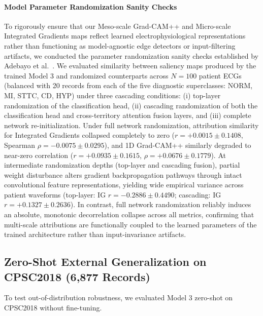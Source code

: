 \documentclass[5p,twocolumn,10pt]{elsarticle}
\begin{document}
\paragraph{Model Parameter Randomization Sanity Checks}
To rigorously ensure that our Meso-scale Grad-CAM++ and Micro-scale Integrated Gradients maps reflect learned electrophysiological representations rather than functioning as model-agnostic edge detectors or input-filtering artifacts, we conducted the parameter randomization sanity checks established by Adebayo et al.~\cite{adebayo2018sanity}. We evaluated similarity between saliency maps produced by the trained Model 3 and randomized counterparts across $N = 100$ patient ECGs (balanced with 20 records from each of the five diagnostic superclasses: NORM, MI, STTC, CD, HYP) under three cascading conditions: (i) top-layer randomization of the classification head, (ii) cascading randomization of both the classification head and cross-territory attention fusion layers, and (iii) complete network re-initialization. Under full network randomization, attribution similarity for Integrated Gradients collapsed completely to zero ($r = +0.0015 \pm 0.1408$, Spearman $\rho = -0.0075 \pm 0.0295$), and 1D Grad-CAM++ similarly degraded to near-zero correlation ($r = +0.0935 \pm 0.1615$, $\rho = +0.0676 \pm 0.1779$). At intermediate randomization depths (top-layer and cascading fusion), partial weight disturbance alters gradient backpropagation pathways through intact convolutional feature representations, yielding wide empirical variance across patient waveforms (top-layer: IG $r = -0.2886 \pm 0.4490$; cascading: IG $r = +0.1327 \pm 0.2636$). In contrast, full network randomization reliably induces an absolute, monotonic decorrelation collapse across all metrics, confirming that multi-scale attributions are functionally coupled to the learned parameters of the trained architecture rather than input-invariance artifacts.

\subsection{Zero-Shot External Generalization on CPSC2018 (6,877 Records)}
To test out-of-distribution robustness, we evaluated Model 3 zero-shot on CPSC2018 without fine-tuning.
\end{document}

